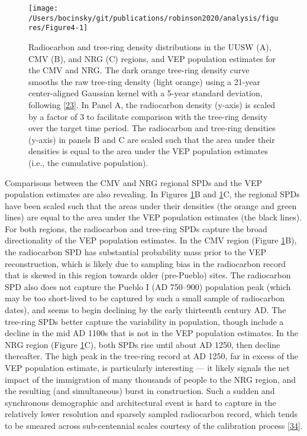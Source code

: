 \documentclass[
]{sa}
\begin{document}
\begin{figure}

{\centering \texttt{[image: /Users/bocinsky/git/publications/robinson2020/analysis/figures/Figure4-1]} 

}

\caption{Radiocarbon and tree-ring density distributions in the UUSW (A), CMV (B), and NRG (C) regions, and VEP population estimates for the CMV and NRG. The dark orange tree-ring density curve smooths the raw tree-ring density (light orange) using a 21-year center-aligned Gaussian kernel with a 5-year standard deviation, following {[}\protect\hyperlink{ref-Bocinsky2016}{23}{]}. In Panel A, the radiocarbon density (y-axis) is scaled by a factor of 3 to facilitate comparison with the tree-ring density over the target time period. The radiocarbon and tree-ring densities (y-axis) in panels B and C are scaled such that the area under their densities is equal to the area under the VEP population estimates (i.e., the cumulative population).}\label{fig:Figure4}
\end{figure}

Comparisons between the CMV and NRG regional SPDs and the VEP population estimates are also revealing. In Figures \ref{fig:Figure4}B and \ref{fig:Figure4}C, the regional SPDs have been scaled such that the areas under their densities (the orange and green lines) are equal to the area under the VEP population estimates (the black lines). For both regions, the radiocarbon and tree-ring SPDs capture the broad directionality of the VEP population estimates. In the CMV region (Figure \ref{fig:Figure4}B), the radiocarbon SPD has substantial probability mass prior to the VEP reconstruction, which is likely due to sampling bias in the radiocarbon record that is skewed in this region towards older (pre-Pueblo) sites. The radiocarbon SPD also does not capture the Pueblo I (AD 750--900) population peak (which may be too short-lived to be captured by such a small sample of radiocarbon dates), and seems to begin declining by the early thirteenth century AD. The tree-ring SPDs better capture the variability in population, though include a decline in the mid AD 1100s that is not in the VEP population estimates. In the NRG region (Figure \ref{fig:Figure4}C), both SPDs rise until about AD 1250, then decline thereafter. The high peak in the tree-ring record at AD 1250, far in excess of the VEP population estimate, is particularly interesting --- it likely signals the net impact of the immigration of many thousands of people to the NRG region, and the resulting (and simultaneous) burst in construction. Such a sudden and synchronous demographic and architectural event is hard to capture in the relatively lower resolution and sparsely sampled radiocarbon record, which tends to be smeared across sub-centennial scales courtesy of the calibration process {[}\protect\hyperlink{ref-Baillie1991}{34}{]}.
\end{document}
